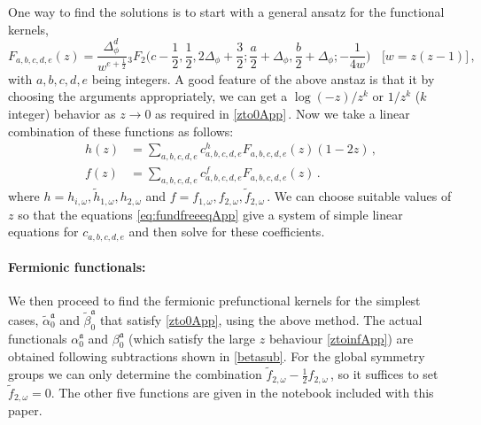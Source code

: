 \documentclass[12pt]{article}
\numberwithin{equation}{section}
\newcommand{\be}{\begin{equation}}
\newcommand{\ee}{\end{equation}}
\def\a{\alpha}
\def\b{\beta}
\def\D{\Delta}
\newcommand{\mf}[1]{\mathfrak #1}
\begin{document}
	
	One way to find the solutions is to start with a general ansatz for the functional kernels,
	\be
	F_{a,b,c,d,e}(z)=\frac{\Delta_\phi ^d \, }{w^{e+\frac{1}{2}}}  {}_3F_2\Big(c-\frac{1}{2},\frac{1}{2},2 \Delta_\phi +\frac{3}{2};\frac{a}{2}+\Delta_\phi ,\frac{b}{2}+\Delta_\phi ;-\frac{1}{4 w}\Big) \ \ \ \  \big[w=z (z-1)\big]\,,
	\ee
	with $a,b,c,d,e$ being integers.
	A good feature of the above anstaz is that it by choosing the arguments appropriately, we can get a $\log(-z)/z^k$ or $1/z^k$ ($k$ integer) behavior as $z\to 0$ as required in \eqref{zto0App}\,. Now we take a  linear combination of these functions as follows:
	\begin{align}
	h(z)&=\sum_{a,b,c,d,e} c^{h}_{a,b,c,d,e} F_{a,b,c,d,e}(z)(1-2z)\,,\nonumber\\
	f(z)&=\sum_{a,b,c,d,e} c^{f}_{a,b,c,d,e} F_{a,b,c,d,e}(z)\,.
	\end{align}
	where $h=h_{i,\omega},\tilde {h}_{1,\omega},h_{2,\omega}$ and $f=f_{1,\omega},f_{2,\omega},\tilde{f}_{2,\omega}$\,.
	We can choose suitable values of $z$ so that the equations \eqref{eq:fundfreeeqApp} give a system of simple linear equations for $c_{a,b,c,d,e}$ and then solve for these coefficients. 
	
	\paragraph{Fermionic functionals:} 
	We then proceed to find the fermionic prefunctional kernels for the simplest cases, $\tilde \alpha_0^{\mf a}$ and $\tilde \beta_0^{\mf a}$ that satisfy \eqref{zto0App}, using the above method. The actual functionals $\alpha_0^{\mf a}$ and $\beta_0^{\mf a}$ (which satisfy the large $z$ behaviour \eqref{ztoinfApp}) are obtained following subtractions shown in  \eqref{betasub}. For the global symmetry groups we can only determine the combination $ \tilde f_{2,\omega}-\frac12 f_{2,\omega}$\,, so it suffices to set  $ \tilde f_{2,\omega}=0$. The other five functions are given in the notebook included with this paper.
	
	
	
\end{document}
